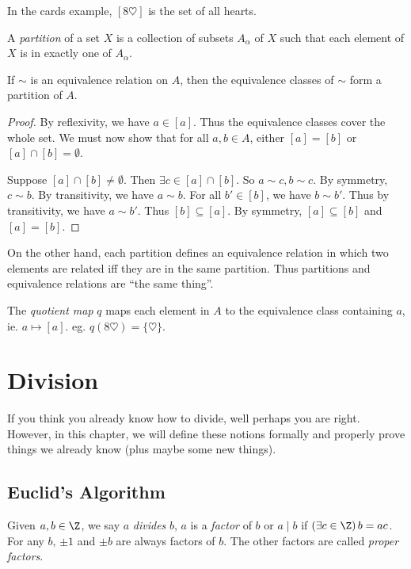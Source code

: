 \documentclass[a4paper]{article}
\begin{document}
\begin{eg}
  In the cards example, $[8\heartsuit]$ is the set of all hearts.
\end{eg}

\begin{defi}
  A \emph{partition} of a set $X$ is a collection of subsets $A_\alpha$ of $X$ such that each element of $X$ is in exactly one of $A_\alpha$.
\end{defi}

\begin{thm}
  If $\sim$ is an equivalence relation on $A$, then the equivalence classes of $\sim$ form a partition of $A$.
\end{thm}

\begin{proof}
  By reflexivity, we have $a\in [a]$. Thus the equivalence classes cover the whole set. We must now show that for all $a, b\in A$, either $[a] = [b]$ or $[a]\cap [b]=\emptyset$.

  Suppose $[a]\cap[b]\not=\emptyset$. Then $\exists c\in [a]\cap[b]$. So $a\sim c, b\sim c$. By symmetry, $c\sim b$. By transitivity, we have $a\sim b$. For all $b'\in [b]$, we have $b\sim b'$. Thus by transitivity, we have $a\sim b'$. Thus $[b]\subseteq[a]$. By symmetry, $[a]\subseteq[b]$ and $[a] = [b]$.
\end{proof}

On the other hand, each partition defines an equivalence relation in which two elements are related iff they are in the same partition. Thus partitions and equivalence relations are ``the same thing''.
\begin{defi}
  The \emph{quotient map} $q$ maps each element in $A$ to the equivalence class containing $a$, ie. $a\mapsto [a]$. eg. $q(8\heartsuit) = \{\heartsuit\}$.
\end{defi}

\section{Division}
If you think you already know how to divide, well perhaps you are right. However, in this chapter, we will define these notions formally and properly prove things we already know (plus maybe some new things).
\subsection{Euclid's Algorithm}
\begin{defi}
  Given $a, b\in \Z$, we say $a$ \emph{divides} $b$, $a$ is a \emph{factor} of $b$ or $a\mid b$ if $(\exists c\in \Z)\,b = ac$. For any $b$, $\pm 1$ and $\pm b$ are always factors of $b$. The other factors are called \emph{proper factors}.
\end{defi}
\end{document}
